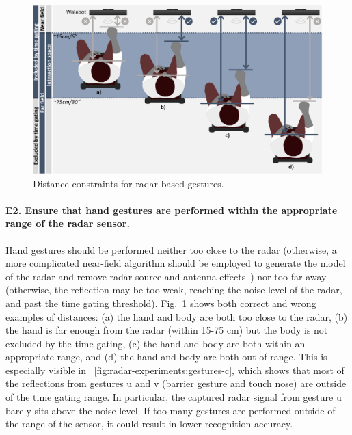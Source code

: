 \begin{figure}[bt]
    \centering
    \includegraphics[width=\linewidth]{Figures/RadarExperiments/Discussion/pipeline-limitations-range.pdf}
    \vspace{-20pt}
    \caption{Distance constraints for radar-based gestures.}
    \label{fig:radar-experiments:discussion:radar-range}
\end{figure}

\paragraph{E2. Ensure that hand gestures are performed within the appropriate range of the radar sensor.}
Hand gestures should be performed neither too close to the radar (otherwise, a more complicated near-field algorithm should be employed to generate the model of the radar and remove radar source and antenna effects~\cite{Lambot:2014}) nor too far away (otherwise, the reflection may be too weak, reaching the noise level of the radar, and past the time gating threshold). Fig.~\ref{fig:radar-experiments:discussion:radar-range} shows both correct and wrong examples of distances: (a) the hand and body are both too close to the radar, (b) the hand is far enough from the radar (within 15-75 cm) but the body is not excluded by the time gating, (c) the hand and body are both within an appropriate range, and (d) the hand and body are both out of range. This is especially visible in \fig~\ref{fig:radar-experiments:gestures-c}, which shows that most of the reflections from gestures u and v (barrier gesture and touch nose) are outside of the time gating range. In particular, the captured radar signal from gesture u barely sits above the noise level. If too many gestures are performed outside of the range of the sensor, it could result in lower recognition accuracy.

